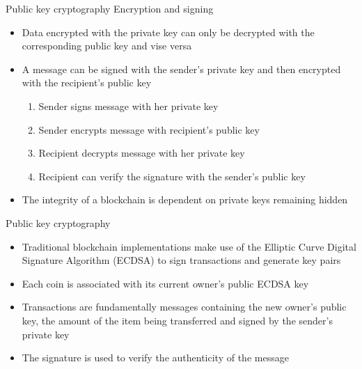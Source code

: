 \documentclass[10pt]{beamer}
\begin{document}

\begin{frame}{Public key cryptography}
	Encryption and signing
	\begin{itemize}
		\item Data encrypted with the private key can only be decrypted with the corresponding public key and vise versa
		\item A message can be signed with the sender's private key and then encrypted with the recipient's public key
		\begin{enumerate}
			\item Sender signs message with her private key
			\item Sender encrypts message with recipient's public key
			\item Recipient decrypts message with her private key
			\item Recipient can verify the signature with the sender's public key
		\end{enumerate}
		\item The integrity of a blockchain is dependent on private keys remaining hidden
	\end{itemize}
\end{frame}




\begin{frame}{Public key cryptography}
	\begin{itemize}
		\item Traditional blockchain implementations make use of the Elliptic Curve Digital Signature Algorithm (ECDSA) to sign transactions and generate key pairs
		\item Each coin is associated with its current owner's public ECDSA key
		\item Transactions are fundamentally messages containing the new owner's public key, the amount of the item being transferred and signed by the sender's private key
		\item The signature is used to verify the authenticity of the message
	\end{itemize}
\end{frame}
\end{document}
